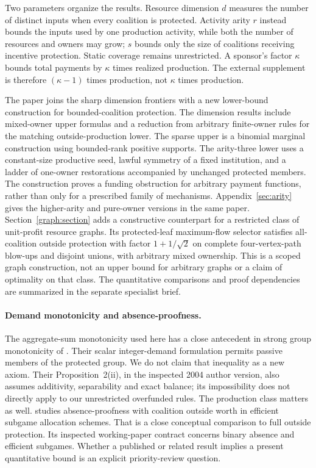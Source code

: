 \documentclass[11pt]{article}
\theoremstyle{definition}\newtheorem{definition}[theorem]{Definition}
\theoremstyle{remark}\newtheorem{remark}[theorem]{Remark}
\begin{document}
Two parameters organize the results. Resource dimension $d$ measures the
number of distinct inputs when every coalition is protected. Activity arity
$r$ instead bounds the inputs used by one production activity, while both the
number of resources and owners may grow; $s$ bounds only the size of coalitions
receiving incentive protection. Static coverage remains unrestricted.
A sponsor's factor $\kappa$ bounds total payments by $\kappa$ times realized
production. The external supplement is therefore $(\kappa-1)$ times
production, not $\kappa$ times production.

The paper joins the sharp dimension frontiers with a new lower-bound
construction for bounded-coalition protection. The dimension results include
mixed-owner upper formulas and a reduction from arbitrary finite-owner rules
for the matching outside-production lower. The sparse upper is a binomial
marginal construction using bounded-rank positive supports. The arity-three
lower uses a constant-size productive seed, lawful symmetry of a fixed
institution, and a ladder of one-owner restorations accompanied by unchanged
protected members. The construction proves a funding obstruction for arbitrary
payment functions, rather than only for a prescribed family of mechanisms.
Appendix~\ref{sec:arity} gives the higher-arity and pure-owner versions in the
same paper. Section~\ref{graph:section} adds a constructive counterpart for a restricted
class of unit-profit resource graphs. Its protected-leaf maximum-flow selector
satisfies all-coalition outside protection with factor $1+1/\sqrt2$ on complete
four-vertex-path blow-ups and disjoint unions, with arbitrary mixed ownership.
This is a scoped graph construction, not an upper bound for arbitrary graphs
or a claim of optimality on that class. The quantitative comparisons and proof
dependencies are summarized in the separate specialist brief.

\paragraph{Demand monotonicity and absence-proofness.}
The aggregate-sum monotonicity used here has a close antecedent in strong group
monotonicity of \citet{MoulinSprumont2004}. Their scalar integer-demand
formulation permits passive members of the protected group. We do not claim
that inequality as a new axiom. Their Proposition~2(ii), in the inspected 2004
author version, also assumes additivity, separability and exact balance; its
impossibility does not directly apply to our unrestricted overfunded rules.
The production class matters as well. \citet{Dogan2013} studies
absence-proofness with coalition outside worth in efficient subgame allocation
schemes. That is a close conceptual comparison to full outside protection.
Its inspected working-paper contract concerns binary absence and efficient
subgames. Whether a published or related result implies a present quantitative
bound is an explicit priority-review question.
\end{document}
